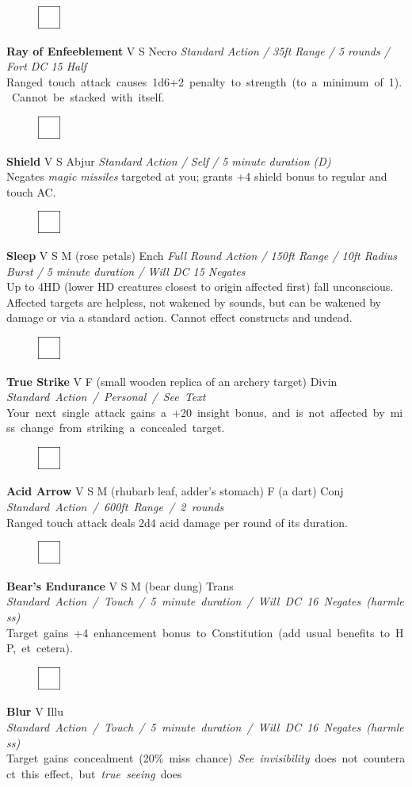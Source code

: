 \documentclass[letterpaper]{article}
\newcommand{\spell}[7]{
\begin{figure}
\vspace{-13pt}
\ifstrequal{#2}{Full}{\includegraphics[width=2em]{Checkbox-Full}}{
                      \includegraphics[width=2em]{Checkbox}}
\ifstrequal{#7}{}{\vspace{-1em}}{\vspace{#7}}
\end{figure}
\noindent \textbf{#1} #3 {
    \ifstrequal{#4}{Conj}{\color{Plum}Conj}{%
    \ifstrequal{#4}{Divin}{\color{YellowOrange}Divin}{%
    \ifstrequal{#4}{Ench}{\color{VioletRed}Ench}{%
    \ifstrequal{#4}{Trans}{\color{LimeGreen}Trans}{%
    \ifstrequal{#4}{Evoc}{\color{RedOrange}Evoc}{%
    \ifstrequal{#4}{Illu}{\color{ProcessBlue}Illu}{%
    \ifstrequal{#4}{Abjur}{\color{CadetBlue}Abjur}{%
    \ifstrequal{#4}{Necro}{\color{Red}Necro}{%
}}}}}}}}}
{\footnotesize \emph{#5}} \\
#6
}
\begin{document}
\spell{Ray of Enfeeblement}{}{V S}{Necro}{Standard Action / 35ft Range / 5 rounds / Fort DC 15 Half}{%
\mbox{Ranged touch attack causes 1d6+2 penalty to strength (to a minimum of 1).  Cannot be stacked with itself.}}{} \\[-1em] %

\spell{Shield}{}{V S}{Abjur}{Standard Action / Self / 5 minute duration (D)}{%
Negates \emph{magic missiles} targeted at you; grants +4 shield bonus to regular and touch AC.}{}\\[-1em] %

\spell{Sleep}{}{V S M (rose petals)}{Ench}{Full Round Action / 150ft Range / 10ft Radius Burst / 5 minute duration / Will DC 15 \nolinebreak Negates}{%
Up to 4HD (lower HD creatures closest to origin affected first) fall unconscious.  Affected targets are helpless, not wakened by sounds, but can be wakened by damage or via a standard action. Cannot effect constructs and undead.}{}\\[-1em] %

\spell{True Strike}{}{V F (small wooden replica of an archery target)}{Divin}{\mbox{Standard Action / Personal / See Text}}{%
\mbox{Your next single attack gains a +20 insight bonus, and is not affected by miss change from striking a concealed target.}}{}\\

\spell{Acid Arrow}{}{V S M (rhubarb leaf, adder's stomach) F (a dart)}{Conj}{\mbox{Standard Action / 600ft Range / 2 rounds}}{%
Ranged touch attack deals 2d4 acid damage per round of its duration.}{}\\[-1em] %

\spell{Bear's Endurance}{}{V S M (bear dung)}{Trans}{\mbox{Standard Action / Touch / 5 minute duration / Will DC 16 Negates (harmless)}} {%
\mbox{Target gains +4 enhancement bonus to Constitution (add usual benefits to HP, et cetera).} }{}\\[-1em] %

\spell{Blur}{}{V}{Illu}{\mbox{Standard Action / Touch / 5 minute duration / Will DC 16 Negates (harmless)}}{%
\mbox{Target gains concealment (20\% miss chance) \emph{See invisibility} does not counteract this effect, but \emph{true seeing} does} }{}\\[-1em] %
\end{document}
